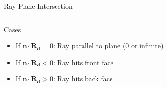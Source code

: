 \begin{frame}{Ray-Plane Intersection}
\begin{columns}
\begin{column}{0.4\textwidth}
        \end{column}
    \end{columns}
    \pause
    \begin{conceptbox}{Cases}
        \begin{itemize}
            \item If $\mathbf{n} \cdot \mathbf{R_d} = 0$: Ray parallel to plane (0 or infinite)
            \item If $\mathbf{n} \cdot \mathbf{R_d} < 0$: Ray hits front face
            \item If $\mathbf{n} \cdot \mathbf{R_d} > 0$: Ray hits back face
        \end{itemize}
    \end{conceptbox}
\end{frame}


